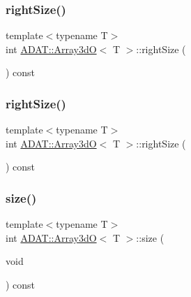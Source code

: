 \mbox{\label{classADAT_1_1Array3dO_a81a9bfa7afe224267642e822ebe09457}} 
\subsubsection{\texorpdfstring{rightSize()}{rightSize()}\hspace{0.1cm}{\footnotesize\ttfamily [2/3]}}
{\footnotesize\ttfamily template$<$typename T$>$ \\
int \mbox{\hyperlink{classADAT_1_1Array3dO}{A\+D\+A\+T\+::\+Array3dO}}$<$ T $>$\+::right\+Size (\begin{DoxyParamCaption}{ }\end{DoxyParamCaption}) const\hspace{0.3cm}{\ttfamily [inline]}}

\mbox{\label{classADAT_1_1Array3dO_a81a9bfa7afe224267642e822ebe09457}} 
\subsubsection{\texorpdfstring{rightSize()}{rightSize()}\hspace{0.1cm}{\footnotesize\ttfamily [3/3]}}
{\footnotesize\ttfamily template$<$typename T$>$ \\
int \mbox{\hyperlink{classADAT_1_1Array3dO}{A\+D\+A\+T\+::\+Array3dO}}$<$ T $>$\+::right\+Size (\begin{DoxyParamCaption}{ }\end{DoxyParamCaption}) const\hspace{0.3cm}{\ttfamily [inline]}}

\mbox{\label{classADAT_1_1Array3dO_a44da6abc6d1597d9df0b983691b952fc}} 
\subsubsection{\texorpdfstring{size()}{size()}\hspace{0.1cm}{\footnotesize\ttfamily [1/3]}}
{\footnotesize\ttfamily template$<$typename T$>$ \\
int \mbox{\hyperlink{classADAT_1_1Array3dO}{A\+D\+A\+T\+::\+Array3dO}}$<$ T $>$\+::size (\begin{DoxyParamCaption}\item[{void}]{ }\end{DoxyParamCaption}) const\hspace{0.3cm}{\ttfamily [inline]}}

